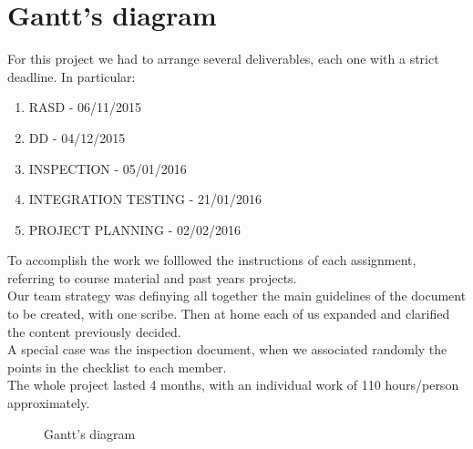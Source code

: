 \section{ Gantt's diagram}
For this project we had to arrange several deliverables, each one with a strict deadline.
In particular:
\begin{enumerate}
\item RASD - 06/11/2015
\item DD - 04/12/2015
\item INSPECTION - 05/01/2016
\item INTEGRATION TESTING - 21/01/2016
\item PROJECT PLANNING - 02/02/2016
\end{enumerate}

To accomplish the work we folllowed the instructions of each assignment, referring 
to course material and past years projects.\\
Our team strategy was definying  all together the main guidelines of the document to be created, with one 
scribe. Then at home each of us expanded and clarified the content previously decided.\\
A special case was the inspection document, when we associated randomly the points in the checklist to each member.\\
The whole project lasted 4 months, with an individual work of 110 hours/person approximately.

\begin{center}
\begin{figure} [h]

\noindent{}

\caption{Gantt's diagram}
 \end{figure}
\end{center}
